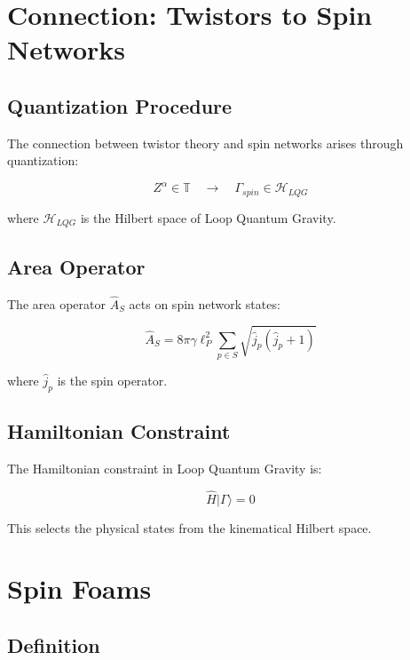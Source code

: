 \documentclass[12pt,a4paper]{article}
\begin{document}
\section{Connection: Twistors to Spin Networks}

\subsection{Quantization Procedure}

The connection between twistor theory and spin networks arises through quantization:

\begin{equation}
Z^\alpha \in \mathbb{T} \quad \longrightarrow \quad \Gamma_{spin} \in \mathcal{H}_{LQG}
\end{equation}

where $\mathcal{H}_{LQG}$ is the Hilbert space of Loop Quantum Gravity.

\subsection{Area Operator}

The area operator $\hat{A}_S$ acts on spin network states:

\begin{equation}
\hat{A}_S = 8\pi \gamma \ell_P^2 \sum_{p \in S} \sqrt{\hat{j}_p(\hat{j}_p + 1)}
\end{equation}

where $\hat{j}_p$ is the spin operator.

\subsection{Hamiltonian Constraint}

The Hamiltonian constraint in Loop Quantum Gravity is:

\begin{equation}
\hat{H} |\Gamma\rangle = 0
\end{equation}

This selects the physical states from the kinematical Hilbert space.

\section{Spin Foams}

\subsection{Definition}
\end{document}
